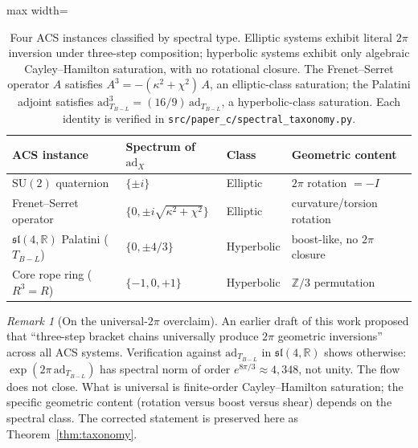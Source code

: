 \documentclass[11pt,a4paper]{article}
\theoremstyle{plain}
\theoremstyle{definition}
\theoremstyle{remark}
\newtheorem{remark}[theorem]{Remark}
\begin{document}
\begin{table}[h]
\centering\small
\begin{adjustbox}{max width=\linewidth}\begin{tabular}{@{}llll@{}}
\toprule
ACS instance & Spectrum of $\mathrm{ad}_X$ & Class & Geometric content \\
\midrule
$\mathrm{SU}(2)$ quaternion & $\{\pm i\}$ & Elliptic & $2\pi$ rotation $= -I$ \\
Frenet--Serret operator & $\{0, \pm i\sqrt{\kappa^2{+}\chi^2}\}$ & Elliptic & curvature/torsion rotation \\
$\mathfrak{sl}(4,\mathbb{R})$ Palatini ($T_{B-L}$) & $\{0, \pm 4/3\}$ & Hyperbolic & boost-like, no $2\pi$ closure \\
Core rope ring ($R^3 = R$) & $\{-1, 0, +1\}$ & Hyperbolic & $\mathbb{Z}/3$ permutation \\
\bottomrule
\end{tabular}\end{adjustbox}
\caption{Four ACS instances classified by spectral type.  Elliptic
systems exhibit literal $2\pi$ inversion under three-step
composition; hyperbolic systems exhibit only algebraic Cayley--Hamilton
saturation, with no rotational closure.  The Frenet--Serret operator
$A$ satisfies $A^3 = -(\kappa^2 + \chi^2)\,A$, an elliptic-class
saturation; the Palatini adjoint satisfies $\mathrm{ad}_{T_{B-L}}^3 =
(16/9)\,\mathrm{ad}_{T_{B-L}}$, a hyperbolic-class saturation.  Each
identity is verified in \nolinkurl{src/paper_c/spectral_taxonomy.py}.}
\label{tab:spectral-classes}
\end{table}

\begin{remark}[On the universal-$2\pi$ overclaim]
An earlier draft of this work proposed that ``three-step bracket
chains universally produce $2\pi$ geometric inversions'' across all
ACS systems.  Verification against $\mathrm{ad}_{T_{B-L}}$ in
$\mathfrak{sl}(4,\mathbb{R})$ shows otherwise:
$\exp(2\pi\,\mathrm{ad}_{T_{B-L}})$ has spectral norm of order
$e^{8\pi/3} \approx 4{,}348$, not unity.  The flow does not close.
What is universal is finite-order Cayley--Hamilton saturation; the
specific geometric content (rotation versus boost versus shear)
depends on the spectral class.  The corrected statement is preserved
here as Theorem~\ref{thm:taxonomy}.
\end{remark}
\end{document}
